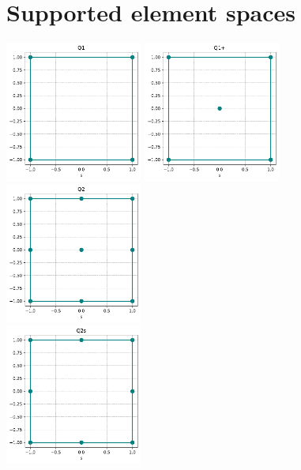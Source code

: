 \newpage
\section*{Supported element spaces}

\begin{center}
\includegraphics[width=4.5cm]{python_codes/fieldstone_120/spaces/Q1_nodes}
\includegraphics[width=4.5cm]{python_codes/fieldstone_120/spaces/Q1+_nodes}
\includegraphics[width=4.5cm]{python_codes/fieldstone_120/spaces/Q2_nodes}\\
\includegraphics[width=4.5cm]{python_codes/fieldstone_120/spaces/Q2s_nodes}

\end{center}
